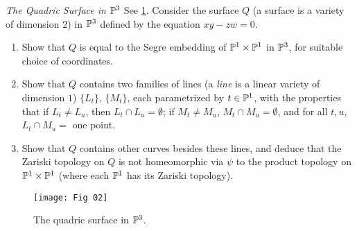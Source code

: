 \label{1.2.15}

\textit{The Quadric Surface in $\P^3$} See \ref{fig1.2.4}. Consider the surface $Q$ (a surface is a variety of dimension $2$) in $\P^3$ defined by the equation $xy - zw = 0$.

\begin{enumerate}[label = (\alph*)]
    \item Show that $Q$ is equal to the Segre embedding of $\P^1 \times \P^1$ in $\P^3$, for suitable choice of coordinates.
    
    \item Show that $Q$ contains two families of lines (a \textit{line} is a linear variety of dimension $1$) $\{L_t\}$, $\{M_t\}$, each parametrized by $t \in \P^1$, with the properties that if $L_t \neq L_u$, then $L_t \cap L_u = \emptyset$; if $M_t \neq M_u$, $M_t \cap M_u = \emptyset$, and for all $t, u$, $L_t \cap M_u = $ one point.
    
    \item Show that $Q$ contains other curves besides these lines, and deduce that the Zariski topology on $Q$ is not homeomorphic via $\psi$ to the product topology on $\P^1 \times \P^1$ (where each $\P^1$ has its Zariski topology).
\end{enumerate}

\begin{figure}
    \centering
    \texttt{[image: Fig 02]}
    \caption{The quadric surface in $\P^3$.}
    \label{fig1.2.4}
\end{figure}

